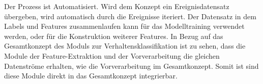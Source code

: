 Der Prozess ist Automatisiert. Wird dem Konzept ein Ereignisdatensatz übergeben, wird automatisch durch die Ereignisse iteriert. Der Datensatz in dem Labels und Features zusammenlaufen kann für das Modelltraining verwendet werden, oder für die Konstruktion weiterer Features. In Bezug auf das Gesamtkonzept des Moduls zur Verhaltensklassifikation ist zu sehen, dass die Module der Feature-Extraktion und der Vorverarbeitung die gleichen Datenströme erhalten, wie die Vorverarbeitung im Gesamtkonzept. Somit ist sind diese Module direkt in das Gesamtkonzept integrierbar.
